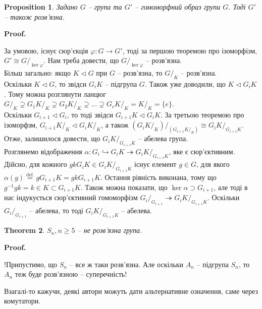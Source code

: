 \documentclass[a4paper, 10pt]{article}
\makeatletter
\theoremstyle{theoremdd}
\newtheorem{theorem}{Theorem}[subsection]
\theoremstyle{theoremdd}
\theoremstyle{theoremdd}
\theoremstyle{theoremdd}
\theoremstyle{theoremdd}
\theoremstyle{theoremdd}
\theoremstyle{theoremdd}
\theoremstyle{theoremdd}
\theoremstyle{theoremdd}
\newtheorem{proposition}[theorem]{Proposition}
\theoremstyle{theoremdd}
\theoremstyle{theoremdd}
\theoremstyle{theoremdd}
\theoremstyle{theoremdd}
\theoremstyle{theoremdd}
\theoremstyle{theoremdd}
\renewenvironment{proof}[1][Proof.\\]{\par
\pushQED{\hfill \qed}%
\normalfont \topsep6\p@\@plus6\p@\relax
\trivlist
\item\relax
{\bfseries
#1\@addpunct{.}}\hspace\labelsep\ignorespaces
}{%
\popQED\endtrivlist\@endpefalse
}
\newcommand{\eqbydef}{\overset{\text{def.}}{=}}
\makeatother
\begin{document}
\begin{proposition}
Задано $G$ -- група та $G'$ -- гомоморфний образ групи $G$. Тоді $G'$ -- також розв'язна.
\end{proposition}

\begin{proof}
За умовою, існує сюр'єкція $\varphi \colon G \to G'$, тоді за першою теоремою про ізоморфізм, $G' \cong G/_{\ker \varphi}$. Нам треба довести, що $G/_{\ker \varphi}$ -- розв'язна.\\
Більш загально: якщо $K \triangleleft G$ при $G$ -- розв'язна, то $G/_K$ -- розв'язна.\\
Оскільки $K \triangleleft G$, то звідси $G_i K$ -- підгрупа $G$. Також уже доводили, що $K \triangleleft G_iK$. Тому можна розглянути ланцюг\\
$G/_K \supsetneq G_1 K/_K \supsetneq G_2 K/_K \supsetneq \dots \supsetneq G_r K/_K = K/_K = \{e\}$.\\
Оскільки $G_{i+1} \triangleleft G_i$, то тоді звідси $G_{i+1} K \triangleleft G_{i} K$. За третьою теоремою про ізоморфзм, $G_{i+1}K/_K \triangleleft G_i K/_K$, а також $\left(G_i K/_K \right)/_{\left( G_{i+1}K/_K \right)} \cong G_i K/_{G_{i+1} K}$.\\
Отже, залишилося довести, що $G_i K/_{G_{i+1} K}$ -- абелева група.\\
Розглянемо відображення $\alpha \colon G_i \hookrightarrow G_i K \twoheadrightarrow G_i K/_{G_{i+1} K}$, яке є сюр'єктивним. Дійсно, для кожного $gk G_i K \in G_i K/_{G_{i+1} K}$ існує елемент $g \in G$, для якого $\alpha(g) \eqbydef gG_{i+1}K = gk G_{i+1}K$. Остання рівність виконана, тому що $g^{-1}gk = k \in K \subset G_{i+1}K$. Також можна показати, що $\ker \alpha \supset G_{i+1}$, але тоді в нас індукується сюр'єктивний гомоморфізм $G_i/_{G_{i+1}} \twoheadrightarrow G_iK/_{G_{i+1}K}$. Оскільки $G_i/_{G_{i+1}}$ -- абелева, то тоді $G_i K/_{G_{i+1}K}$ -- абелева.
\end{proof}

\begin{theorem}
$S_n, n \geq 5$ -- не розв'язна група.
\end{theorem}

\begin{proof}
!Припустимо, що $S_n$ -- все ж таки розв'язна. Але оскільки $A_n$ -- підгрупа $S_n$, то $A_n$ теж буде розв'язною -- суперечність!
\end{proof}

Взагалі-то кажучи, деякі автори можуть дати альтернативне означення, саме через комутатори.
\end{document}
